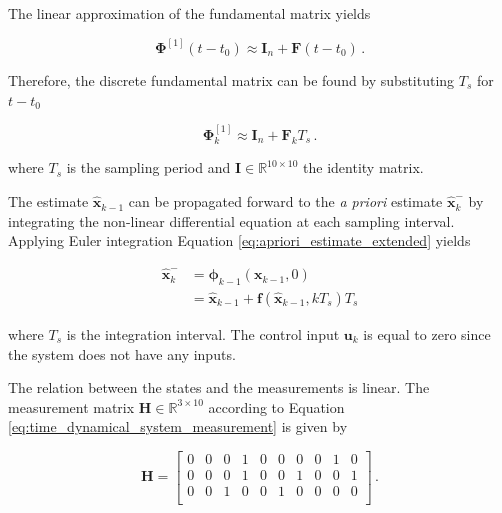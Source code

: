 \noindent
The linear approximation of the fundamental matrix yields

\begin{equation}
  \bm{\Phi}^{[1]}(t-t_0) \approx \mathbf{I}_n + \mathbf{F} (t-t_0)\,.
\end{equation}

\noindent
Therefore, the discrete fundamental matrix can be found by substituting $T_s$ for $t-t_0$

\begin{equation}
  \bm{\Phi}^{[1]}_{k} \approx \mathbf{I}_{n} + \mathbf{F}_k T_s\,.
\end{equation}

\noindent
where $T_s$ is the sampling period and $\mathbf{I} \in \mathbb{R}^{10 \times 10}$ the identity matrix. 

The estimate $\hat{\mathbf{x}}_{k-1}$ can be propagated forward to the \emph{a priori} estimate $\hat{\mathbf{x}}^{-}_k$ by integrating the non-linear differential equation at each sampling interval. Applying Euler integration Equation \ref{eq:apriori_estimate_extended} yields

\begin{equation}\label{eq:apriori_estimate_extended_model}
\begin{split}
	\hat{\mathbf{x}}^{-}_k &= \bm{\phi}_{k-1}(\mathbf{x}_{k-1}, 0) \\
	&= \hat{\mathbf{x}}_{k-1} + \mathbf{f}(\hat{\mathbf{x}}_{k-1}, kT_s)T_s
\end{split}  
\end{equation}

\noindent
where $T_s$ is the integration interval. The control input $\mathbf{u}_k$ is equal to zero since the system does not have any inputs.

The relation between the states and the measurements is linear. The measurement matrix $\mathbf{H} \in \mathbb{R}^{3 \times 10}$ according to Equation \ref{eq:time_dynamical_system_measurement} is given by 

\begin{equation}
\mathbf{H} = \begin{bmatrix}
  0 & 0 & 0 & 1 & 0 & 0 & 0 & 0 & 1 & 0\\
  0 & 0 & 0 & 1 & 0 & 0 & 1 & 0 & 0 & 1\\
  0 & 0 & 1 & 0 & 0 & 1 & 0 & 0 & 0 & 0\\
\end{bmatrix}\,.
\end{equation}

